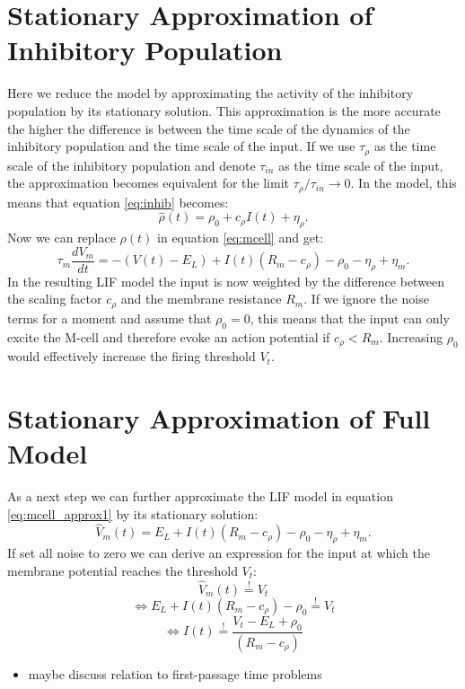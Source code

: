 \documentclass[a4paper,10pt,hidelinks]{scrreprt}
\begin{document}
	\section{Stationary Approximation of Inhibitory Population}
	Here we reduce the model by approximating the activity of the inhibitory population by its 
	stationary solution.
	This approximation is the more accurate the higher the difference is between the time scale of 
	the dynamics of the inhibitory population and the time scale of the input.
	If we use $\tau_{\rho}$ as the time scale of the inhibitory population and denote $\tau_{in}$ 
	as the time scale of the input, the approximation becomes equivalent for the limit 
	$\tau_{\rho}/ \tau_{in} \rightarrow 0$.
	In the model, this means that equation \ref{eq:inhib} becomes:
	\begin{equation}
	\hat{\rho} (t) = \rho_{0} + c_{\rho} I(t) + \eta_{\rho}.
	\label{eq:inhib_approx}
	\end{equation}
	Now we can replace $\rho (t)$ in equation \ref{eq:mcell} and get:
	\begin{equation}
	\tau _m \frac{dV_m}{dt} = - (V(t) - E_{L}) + I(t)(R_{m} - c_{\rho}) - \rho_{0} - 
	\eta_{\rho} +  \eta _m.
	\label{eq:mcell_approx1}
	\end{equation}
	In the resulting LIF model the input is now weighted by the difference between the scaling 
	factor $c_{\rho}$ and the membrane resistance $R_m$.
	If we ignore the noise terms for a moment and assume that $\rho_{0}=0$, this means that the 
	input can only excite the M-cell and therefore evoke an action potential if $c_{\rho} < R_m$.
	Increasing $\rho_{0}$ would effectively increase the firing threshold $V_t$.
	\section{Stationary Approximation of Full Model}
	As a next step we can further approximate the LIF model in equation \ref{eq:mcell_approx1} by 
	its stationary solution:
	\begin{equation}
	\hat{V}_m(t) = E_{L} + I(t)(R_{m} - c_{\rho}) - \rho_{0} - 
	\eta_{\rho} +  \eta _m.
	\end{equation}
	If set all noise to zero we can derive an expression for the input at which the membrane 
	potential reaches the threshold $V_{t}$:
	\begin{equation}
	\hat{V}_m(t) \overset{!}{=} V_t
	\end{equation}
	\begin{equation}
	\Leftrightarrow E_{L} + I(t)(R_{m} - c_{\rho}) - \rho_{0} 
	\overset{!}{=} V_t
	\end{equation}
	\begin{equation}
	\Leftrightarrow I(t)
	\overset{!}{=} \frac{V_t - E_{L} + \rho_{0}}{(R_{m} - c_{\rho})}
	\label{eq:crit_input}
	\end{equation}
	\begin{itemize}
		\item maybe discuss relation to first-passage time problems
	\end{itemize}
\end{document}
